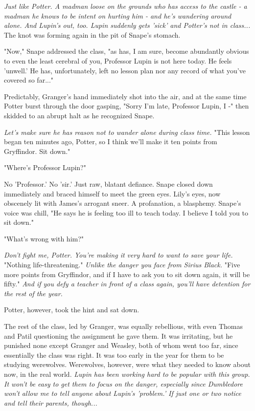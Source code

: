 \documentclass[a4paper,11pt]{article}
\begin{document}
\emph{Just like Potter. A madman loose on the grounds who has access to the castle - a madman he knows to be intent on hurting him - and he's wandering around alone. And Lupin's out, too. Lupin suddenly gets 'sick' and Potter's not in class...} The knot was forming again in the pit of Snape's stomach.

"Now," Snape addressed the class, "as has, I am sure, become abundantly obvious to even the least cerebral of you, Professor Lupin is not here today. He feels 'unwell.' He has, unfortunately, left no lesson plan nor any record of what you've covered so far..."

Predictably, Granger's hand immediately shot into the air, and at the same time Potter burst through the door gasping, "Sorry I'm late, Professor Lupin, I -" then skidded to an abrupt halt as he recognized Snape.

\emph{Let's make sure he has reason not to wander alone during class time.} "This lesson began ten minutes ago, Potter, so I think we'll make it ten points from Gryffindor. Sit down."

"Where's Professor Lupin?"

No 'Professor.' No 'sir.' Just raw, blatant defiance. Snape closed down immediately and braced himself to meet the green eyes. Lily's eyes, now obscenely lit with James's arrogant sneer. A profanation, a blasphemy. Snape's voice was chill, "He says he is feeling too ill to teach today. I believe I told you to sit down."

"What's wrong with him?"

\emph{Don't fight me, Potter. You're making it very hard to want to save your life.} "Nothing life-threatening." \emph{Unlike the danger you face from Sirius Black.} "Five more points from Gryffindor, and if I have to ask you to sit down again, it will be fifty." \emph{And if you defy a teacher in front of a class again, you'll have detention for the rest of the year.}

Potter, however, took the hint and sat down.

The rest of the class, led by Granger, was equally rebellious, with even Thomas and Patil questioning the assignment he gave them. It was irritating, but he punished none except Granger and Weasley, both of whom went too far, since essentially the class was right. It was too early in the year for them to be studying werewolves. Werewolves, however, were what they needed to know about now, in the real world. \emph{Lupin has been working hard to be popular with this group. It won't be easy to get them to focus on the danger, especially since Dumbledore won't allow me to tell anyone about Lupin's 'problem.' If just one or two notice and tell their parents, though...}
\end{document}
